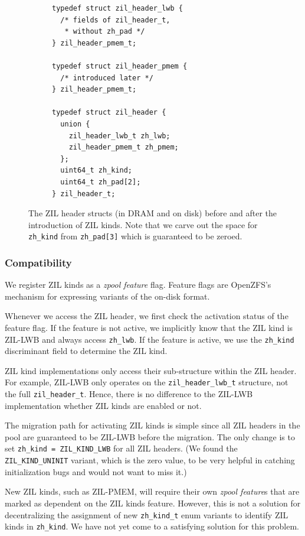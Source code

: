 \documentclass[12pt,a4paper,twoside]{book}
\begin{document}
{\begin{figure}[H]
\begin{subfigure}[t]{0.5\textwidth}
\begin{lstlisting}[basicstyle=\scriptsize\ttfamily]
typedef struct zil_header_lwb {
  /* fields of zil_header_t,
   * without zh_pad */
} zil_header_pmem_t;

typedef struct zil_header_pmem {
  /* introduced later */
} zil_header_pmem_t;

typedef struct zil_header {
  union {
    zil_header_lwb_t zh_lwb;
    zil_header_pmem_t zh_pmem;
  };
  uint64_t zh_kind;
  uint64_t zh_pad[2];
} zil_header_t;

\end{lstlisting}
\end{subfigure}
\caption{The ZIL header structs (in DRAM and on disk) before and after the introduction of ZIL kinds. Note that we carve out the space for \lstinline{zh_kind} from \lstinline{zh_pad[3]} which is guaranteed to be zeroed.}
\label{lst:zil_header_before_and_after}
\end{figure}

\subsubsection{Compatibility}

We register ZIL kinds as a \textit{zpool feature} flag.
Feature flags are OpenZFS's mechanism for expressing variants of the on-disk format.

Whenever we access the ZIL header, we first check the activation status of the feature flag.
If the feature is not active, we implicitly know that the ZIL kind is ZIL-LWB and always access \lstinline{zh_lwb}.
If the feature is active, we use the \lstinline{zh_kind} discriminant field to determine the ZIL kind.

ZIL kind implementations only access their sub-structure within the ZIL header.
For example, ZIL-LWB only operates on the \lstinline{zil_header_lwb_t} structure, not the full \lstinline{zil_header_t}.
Hence, there is no difference to the ZIL-LWB implementation whether ZIL kinds are enabled or not.

The migration path for activating ZIL kinds is simple since all ZIL headers in the pool are guaranteed to be ZIL-LWB before the migration.
The only change is to set \lstinline{zh_kind = ZIL_KIND_LWB} for all ZIL headers.
(We found the \lstinline{ZIL_KIND_UNINIT} variant, which is the zero value, to be very helpful in catching initialization bugs and would not want to miss it.)

New ZIL kinds, such as ZIL-PMEM, will require their own \textit{zpool feature}s that are marked as dependent on the ZIL kinds feature.
However, this is not a solution for decentralizing the assignment of new \lstinline{zh_kind_t} enum variants to identify ZIL kinds in \lstinline{zh_kind}.
We have not yet come to a satisfying solution for this problem.

}
\end{document}
